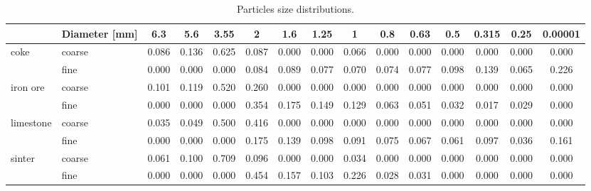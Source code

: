 \begin{sidewaystable}%
\centering
\begin{tabular}{ll|ccccccccccccc}
\hline
          & Diameter [mm] & 6.3   & 5.6   & 3.55  & 2     & 1.6   & 1.25  & 1     & 0.8   & 0.63  & 0.5   & 0.315 & 0.25  & 0.00001 \\
\hline
    coke  & coarse & 0.086 & 0.136 & 0.625 & 0.087 & 0.000 & 0.000 & 0.066 & 0.000 & 0.000 & 0.000 & 0.000 & 0.000 & 0.000 \\
      & fine & 0.000 & 0.000 & 0.000 & 0.084 & 0.089 & 0.077 & 0.070 & 0.074 & 0.077 & 0.098 & 0.139 & 0.065 & 0.226 \\
\hline
    iron ore & coarse & 0.101 & 0.119 & 0.520 & 0.260
    & 0.000 & 0.000 & 0.000 & 0.000 & 0.000 & 0.000 & 0.000 & 0.000 & 0.000 \\
     & fine & 0.000 & 0.000 & 0.000 & 0.354 & 0.175 & 0.149 & 0.129 & 0.063 & 0.051 & 0.032 & 0.017 & 0.029 & 0.000 \\
\hline
    limestone & coarse & 0.035 & 0.049 & 0.500 & 0.416 & 0.000 & 0.000 & 0.000 & 0.000 & 0.000 & 0.000 & 0.000 & 0.000 & 0.000 \\
     & fine & 0.000 & 0.000 & 0.000 & 0.175 & 0.139 & 0.098 & 0.091 & 0.075 & 0.067 & 0.061 & 0.097 & 0.036 & 0.161 \\
\hline
    sinter & coarse & 0.061 & 0.100 & 0.709 & 0.096 & 0.000 & 0.000 & 0.034 & 0.000 & 0.000 & 0.000 & 0.000 & 0.000 & 0.000 \\
     & fine & 0.000 & 0.000 & 0.000 & 0.454 & 0.157 & 0.103 & 0.226 & 0.028 & 0.031 & 0.000 & 0.000 & 0.000 & 0.000 \\
    
\hline
\end{tabular}
\caption{Particles size distributions.}
\label{tab:19particlesizedistributions}
\end{sidewaystable}